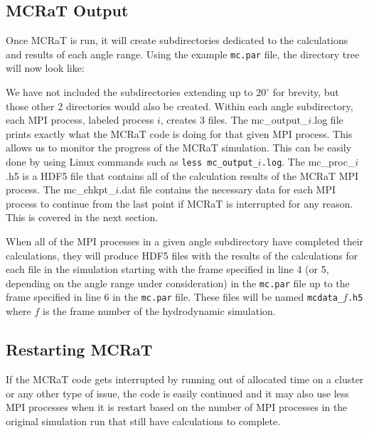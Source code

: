\documentclass[12pt,a4paper]{article}
\begin{document}
 \subsection{MCRaT Output}
 Once MCRaT is run, it will create subdirectories dedicated to the calculations and results of each angle range. Using the example \texttt{mc.par} file, the directory tree will now look like: 
 
 \begin{figure}[h!]
 \end{figure}
 
 We have not included the subdirectories extending up to $20^\circ$ for brevity, but those other 2 directories would also be created. Within each angle subdirectory, each MPI process, labeled process $i$, creates 3 files. The mc\_output\_$i$.log file prints exactly what the MCRaT code is doing for that given MPI process. This allows us to monitor the progress of the MCRaT simulation. This can be easily done by using Linux commands such as \texttt{less mc\_output\_$i$.log}. The mc\_proc\_$i$.h5 is a HDF5 file that contains all of the calculation results of the MCRaT MPI process. The mc\_chkpt\_$i$.dat file contains the necessary data for each MPI process to continue from the last point if MCRaT is interrupted for any reason. This is covered in the next section.
 
 When all of the MPI processes in a given angle subdirectory have completed their calculations, they will produce HDF5 files with the results of the calculations for each file in the simulation starting with the frame specified in line 4 (or 5, depending on the angle range under consideration) in the \texttt{mc.par} file up to the frame specified in line 6 in the \texttt{mc.par} file. These files will be named \texttt{mcdata\_$f$.h5} where $f$ is the frame number of the hydrodynamic simulation.
 
 \subsection{Restarting MCRaT}
 If the MCRaT code gets interrupted by running out of allocated time on a cluster or any other type of issue, the code is easily continued and it may also use less MPI processes when it is restart based on the number of MPI processes in the original simulation run that still have calculations to complete. 
 
\end{document}
